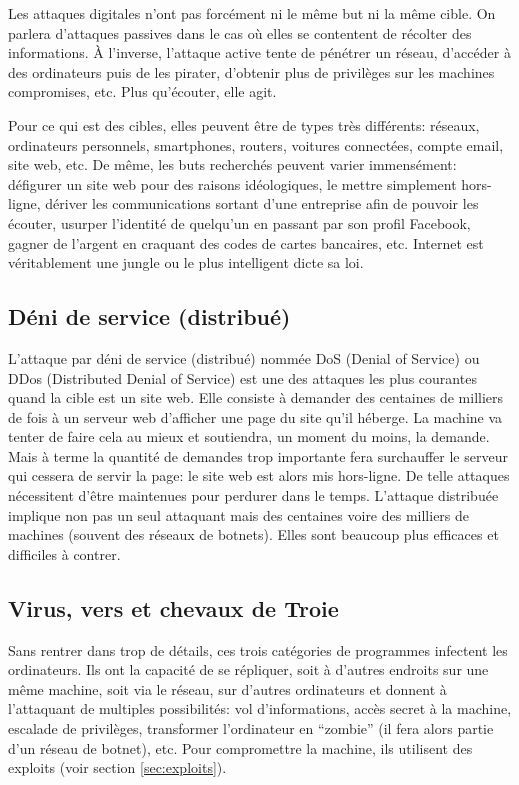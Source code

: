 \documentclass[article]{yReport}
\begin{document}
	Les attaques digitales n'ont pas forcément ni le même but ni la même cible.
	On parlera d'attaques passives dans le cas où elles se contentent de récolter des informations.
	À l'inverse, l'attaque active tente de pénétrer un réseau, d'accéder à des ordinateurs puis de les pirater, d'obtenir plus de privilèges sur les machines compromises, etc.
	Plus qu'écouter, elle agit.
	
	Pour ce qui est des cibles, elles peuvent être de types très différents: réseaux, ordinateurs personnels, smartphones, routers, voitures connectées, compte email, site web, etc.
	De même, les buts recherchés peuvent varier immensément: défigurer un site web pour des raisons idéologiques, le mettre simplement hors-ligne, dériver les communications sortant d'une entreprise afin de pouvoir les écouter, usurper l'identité de quelqu'un en passant par son profil Facebook, gagner de l'argent en craquant des codes de cartes bancaires, etc.
	Internet est véritablement une jungle ou le plus intelligent dicte sa loi.
	
	\subsection{Déni de service (distribué)}
	\label{app:DoS}
	L'attaque par déni de service (distribué) nommée DoS (Denial of Service) ou DDos (Distributed Denial of Service) est une des attaques les plus courantes quand la cible est un site web.
	Elle consiste à demander des centaines de milliers de fois à un serveur web d'afficher une page du site qu'il héberge.
	La machine va tenter de faire cela au mieux et soutiendra, un moment du moins, la demande.
	Mais à terme la quantité de demandes trop importante fera surchauffer le serveur qui cessera de servir la page: le site web est alors mis hors-ligne.
	De telle attaques nécessitent d'être maintenues pour perdurer dans le temps.
	L'attaque distribuée implique non pas un seul attaquant mais des centaines voire des milliers de machines (souvent des réseaux de botnets).
	Elles sont beaucoup plus efficaces et difficiles à contrer.
	
	\subsection{Virus, vers et chevaux de Troie}
	Sans rentrer dans trop de détails, ces trois catégories de programmes infectent les ordinateurs.
	Ils ont la capacité de se répliquer, soit à d'autres endroits sur une même machine, soit via le réseau, sur d'autres ordinateurs et donnent à l'attaquant de multiples possibilités: vol d'informations, accès secret à la machine, escalade de privilèges, transformer l'ordinateur en \enquote{zombie} (il fera alors partie d'un réseau de botnet), etc.
	Pour compromettre la machine, ils utilisent des exploits (voir section \ref{sec:exploits}).
	
\end{document}

